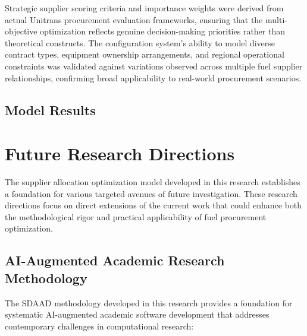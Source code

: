 Strategic supplier scoring criteria and importance weights were derived from actual Unitrans procurement evaluation frameworks, ensuring that the multi-objective optimization reflects genuine decision-making priorities rather than theoretical constructs. The configuration system's ability to model diverse contract types, equipment ownership arrangements, and regional operational constraints was validated against variations observed across multiple fuel supplier relationships, confirming broad applicability to real-world procurement scenarios.


\subsection{Model Results }

\section{Future Research Directions}\label{sec:future}

The supplier allocation optimization model developed in this research establishes a foundation for various targeted avenues of future investigation. These research directions focus on direct extensions of the current work that could enhance both the methodological rigor and practical applicability of fuel procurement optimization.

\subsection{AI-Augmented Academic Research Methodology}

The SDAAD methodology developed in this research provides a foundation for systematic AI-augmented academic software development that addresses contemporary challenges in computational research:

